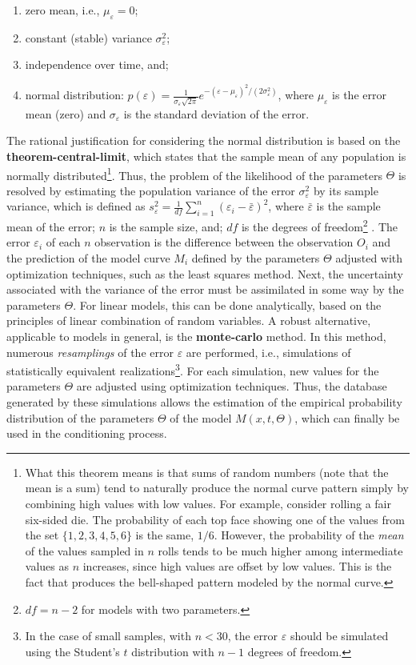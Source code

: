 \documentclass[./main_en.tex]{subfiles}
\begin{document}
\begin{enumerate}
    \item zero mean, i.e., $\mu_{\varepsilon} = 0$;
    \item constant (stable) variance $\sigma_{\varepsilon}^2$;
    \item independence over time, and;
    \item normal distribution: $p(\varepsilon) = \frac{1}{\sigma_{\varepsilon} \sqrt{2\pi}}e^{-(\varepsilon-\mu_{\varepsilon})^2/{(2\sigma_{\varepsilon}^2)}}$, where $\mu_{\varepsilon}$ is the error mean (zero) and $\sigma_{\varepsilon}$ is the standard deviation of the error.
\end{enumerate}
\par The rational justification for considering the normal distribution is based on the \textbf{\gls{theorem-central-limit}}, which states that the sample mean of any population is normally distributed\footnote{What this theorem means is that sums of random numbers (note that the mean is a sum) tend to naturally produce the normal curve pattern simply by combining high values with low values. For example, consider rolling a fair six-sided die. The probability of each top face showing one of the values from the set $\{1, 2, 3, 4, 5, 6\}$ is the same, $1/6$. However, the probability of the \textit{mean} of the values sampled in $n$ rolls tends to be much higher among intermediate values as $n$ increases, since high values are offset by low values. This is the fact that produces the bell-shaped pattern modeled by the normal curve.}. Thus, the problem of the \gls{likelihood} of the \gls{parameters} $\Theta$ is resolved by estimating the population variance of the error $\sigma^2_\varepsilon$ by its sample variance, which is defined as $s^2_{\varepsilon} = \frac{1}{df}\sum_{i=1}^{n}({\varepsilon_i - \bar{\varepsilon}})^2$, where $\bar{\varepsilon}$ is the sample mean of the error; $n$ is the sample size, and; $df$ is the degrees of freedom\footnote{$df = n-2$ for models with two \gls{parameters}.} \cite{graybill1994}. The error $\varepsilon_i$ of each $n$ observation is the difference between the observation $O_i$ and the prediction of the model curve $M_i$ defined by the \gls{parameters} $\Theta$ adjusted with optimization techniques, such as the least squares method. Next, the uncertainty associated with the variance of the error must be assimilated in some way by the \gls{parameters} $\Theta$. For linear models, this can be done analytically, based on the principles of linear combination of random variables. A robust alternative, applicable to models in general, is the \textbf{\gls{monte-carlo}} method. In this method, numerous \textit{resamplings} of the error $\varepsilon$ are performed, i.e., simulations of statistically equivalent realizations\footnote{In the case of small samples, with $n < 30$, the error $\varepsilon$ should be simulated using the Student’s $t$ distribution with $n-1$ degrees of freedom.}. For each simulation, new values for the \gls{parameters} $\Theta$ are adjusted using optimization techniques. Thus, the database generated by these simulations allows the estimation of the empirical probability distribution of the \gls{parameters} $\Theta$ of the \gls{model} $M(x, t, \Theta)$, which can finally be used in the \gls{conditioning} process.
\end{document}
